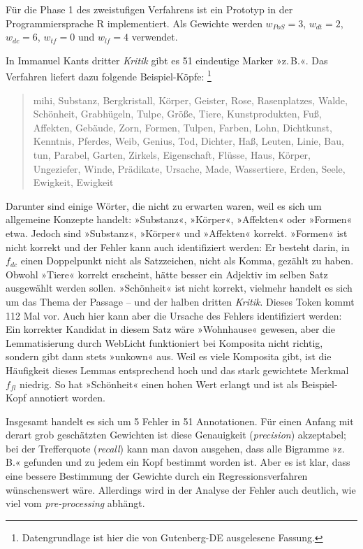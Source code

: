 \documentclass{article}
\newcommand*{\lit}{\textit}%
\newcommand*{\englisch}[1]{\foreignlanguage{english}{\textit{#1}}}%
\begin{document}
Für die Phase 1 des zweistufigen Verfahrens ist ein Prototyp in der
Programmiersprache R implementiert. Als Gewichte werden $w_{PoS}=3$,
$w_{dt}=2$, $w_{dc}=6$, $w_{tf}=0$ und $w_{lf}=4$ verwendet.

In Immanuel Kants dritter \lit{Kritik} gibt es 51 eindeutige Marker
»z.\,B.«. Das Verfahren liefert dazu folgende Beispiel-Köpfe:%
\footnote{Datengrundlage ist hier die von Gutenberg-DE ausgelesene
  Fassung.} %
\begin{quote}
  mihi, Substanz, Bergkristall, Körper, Geister, Rose, Rasenplatzes,
  Walde, Schönheit, Grabhügeln, Tulpe, Größe, Tiere, Kunstprodukten,
  Fuß, Affekten, Gebäude, Zorn, Formen, Tulpen, Farben, Lohn,
  Dichtkunst, Kenntnis, Pferdes, Weib, Genius, Tod, Dichter, Haß,
  Leuten, Linie, Bau, tun, Parabel, Garten, Zirkels, Eigenschaft,
  Flüsse, Haus, Körper, Ungeziefer, Winde, Prädikate, Ursache, Made,
  Wassertiere, Erden, Seele, Ewigkeit, Ewigkeit
\end{quote}

Darunter sind einige Wörter, die nicht zu erwarten waren, weil es sich
um allgemeine Konzepte handelt: »Substanz«, »Körper«, »Affekten« oder
»Formen« etwa. Jedoch sind »Substanz«, »Körper« und »Affekten«
korrekt. »Formen« ist nicht korrekt und der Fehler kann auch
identifiziert werden: Er besteht darin, in $f_{dc}$ einen Doppelpunkt
nicht als Satzzeichen, nicht als Komma, gezählt zu haben. Obwohl
»Tiere« korrekt erscheint, hätte besser ein Adjektiv im selben Satz
ausgewählt werden sollen. »Schönheit« ist nicht korrekt, vielmehr
handelt es sich um das Thema der Passage -- und der halben dritten
\lit{Kritik}. Dieses Token kommt 112 Mal vor. Auch hier kann aber die
Ursache des Fehlers identifiziert werden: Ein korrekter Kandidat in
diesem Satz wäre »Wohnhause« gewesen, aber die Lemmatisierung durch
WebLicht funktioniert bei Komposita nicht richtig, sondern gibt dann
stets »unkown« aus. Weil es viele Komposita gibt, ist die Häufigkeit
dieses Lemmas entsprechend hoch und das stark gewichtete Merkmal
$f_{fl}$ niedrig. So hat »Schönheit« einen hohen Wert erlangt und ist
als Beispiel-Kopf annotiert worden.

Insgesamt handelt es sich um 5 Fehler in 51 Annotationen. Für einen
Anfang mit derart grob geschätzten Gewichten ist diese Genauigkeit
(\englisch{precision}) akzeptabel; bei der Trefferquote
(\englisch{recall}) kann man davon ausgehen, dass alle Bigramme
»z.\,B.« gefunden und zu jedem ein Kopf
bestimmt worden ist. Aber es ist klar, dass eine bessere Bestimmung
der Gewichte durch ein Regressionsverfahren wünschenswert
wäre. Allerdings wird in der Analyse der Fehler auch deutlich, wie
viel vom \englisch{pre-processing} abhängt.
\end{document}
